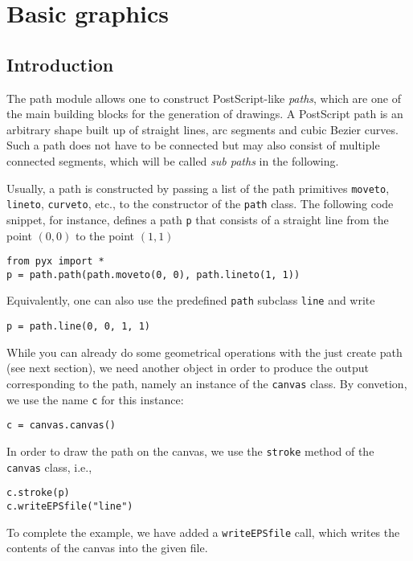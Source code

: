 \chapter{Basic graphics}

\label{path}

\section{Introduction}

The path module allows one to construct PostScript-like
\textit{paths}, which are one of the main building blocks for the
generation of drawings. A PostScript path is an arbitrary shape built
up of straight lines, arc segments and cubic Bezier curves. Such a
path does not have to be connected but may also consist of multiple
connected segments, which will be called \textit{sub paths} in the
following.

Usually, a path is constructed by passing a list of the path
primitives \verb|moveto|, \verb|lineto|, \verb|curveto|, etc., to the
constructor of the \verb|path| class. The following code snippet, for
instance, defines a path \verb|p| that consists of a straight line
from the point $(0, 0)$ to the point $(1, 1)$
\begin{verbatim}
from pyx import *
p = path.path(path.moveto(0, 0), path.lineto(1, 1))
\end{verbatim}
Equivalently, one can also use the predefined \verb|path| subclass
\verb|line| and write
\begin{verbatim}
p = path.line(0, 0, 1, 1)
\end{verbatim}

While you can already do some geometrical operations with the
just create path (see next section), we need another \PyX{} object
in order to produce the output corresponding to the path, namely
an instance of the \verb|canvas| class. By convetion, we use
the name \verb|c| for this instance:
\begin{verbatim}
c = canvas.canvas()
\end{verbatim}
In order to draw the path on the canvas, we use the \verb|stroke| method
of the \verb|canvas| class, i.e.,
\begin{verbatim}
c.stroke(p)
c.writeEPSfile("line")
\end{verbatim}
To complete the example, we have added a \verb|writeEPSfile| call,
which writes the contents of the canvas into the given file.

